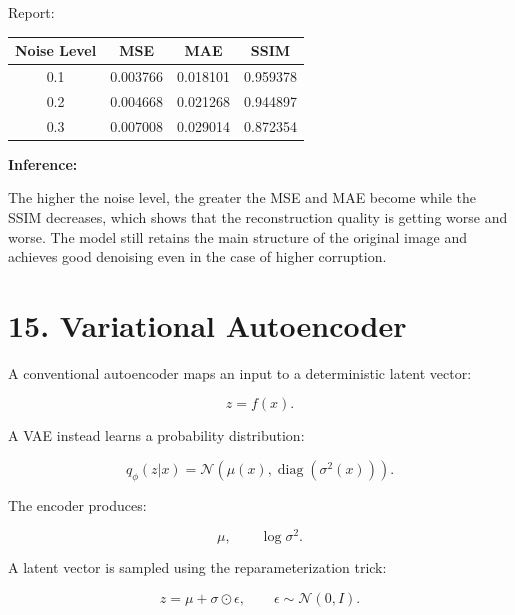 \documentclass[10pt]{article}
\begin{document}
\vspace{5mm}

Report:

\begin{center}
\begin{tabular}{|c|c|c|c|}
\hline
Noise Level & MSE & MAE & SSIM\\
\hline
0.1 & 0.003766 & 0.018101 & 0.959378\\
0.2 & 0.004668 & 0.021268 & 0.944897\\
0.3 & 0.007008 & 0.029014 & 0.872354\\
\hline
\end{tabular}
\end{center}

\textbf{Inference:}

The higher the noise level, the greater the MSE and MAE become while the SSIM decreases, which shows that the reconstruction quality is getting worse and worse.
The model still retains the main structure of the original image and achieves good denoising even in the case of higher corruption.


\section*{15. Variational Autoencoder}

A conventional autoencoder maps an input to a deterministic latent vector:

\[
z=f(x).
\]

A VAE instead learns a probability distribution:

\[
q_{\phi}(z|x)
=
\mathcal{N}
\left(
\mu(x),
\operatorname{diag}(\sigma^2(x))
\right).
\]

The encoder produces:

\[
\mu,\qquad \log\sigma^2.
\]

A latent vector is sampled using the reparameterization trick:

\[
z=\mu+\sigma\odot\epsilon,
\qquad
\epsilon\sim\mathcal{N}(0,I).
\]

\begin{center}
\end{center}
\end{document}
